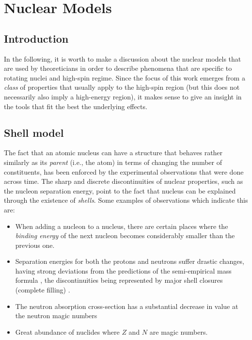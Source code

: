 \chapter{Nuclear Models}
\label{chapter-3}
\section{Introduction}

In the following, it is worth to make a discussion about the nuclear models that are used by theoreticians in order to describe phenomena that are specific to rotating nuclei and high-spin regime. Since the focus of this work emerges from a \emph{class} of properties that usually apply to the high-spin region (but this does not necessarily also imply a high-energy region), it makes sense to give an insight in the tools that fit the best the underlying effects.

\section{Shell model}

The fact that an atomic nucleus can have a structure that behaves rather similarly as its \emph{parent} (i.e., the atom) in terms of changing the number of constituents, has been enforced by the experimental observations that were done across time. The sharp and discrete discontinuities of nuclear properties, such as the nucleon separation energy, point to the fact that nucleus can be explained through the existence of \emph{shells}. Some examples of observations which indicate this are:
\begin{itemize}
    \item When adding a nucleon to a nucleus, there are certain places where the \emph{binding energy} of the next nucleon becomes considerably smaller than the previous one. 
    \item Separation energies for both the protons and neutrons suffer drastic changes, having strong deviations from the predictions of the semi-empirical mass formula \cite{weizsacker1935theorie}, the discontinuities being represented by major shell closures (complete filling) \cite{krane1991introductory}.
    \item The neutron absorption cross-section has a substantial decrease in value at the neutron magic numbers
    \item Great abundance of nuclides where $Z$ and $N$ are magic numbers.
\end{itemize}

